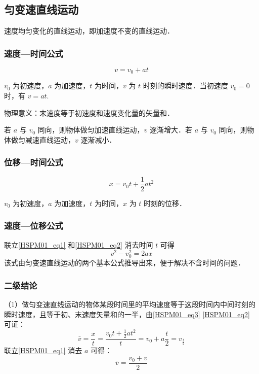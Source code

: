 \subsection{匀变速直线运动}
速度均匀变化的直线运动，即加速度不变的直线运动．
\subsubsection{速度—时间公式}
\begin{equation}\label{HSPM01_eq1}
v=v_0+at
\end{equation}

$v_0$ 为初速度，$a$ 为加速度，$t$ 为时间，$v$ 为 $t$ 时刻的瞬时速度．当初速度 $v_0=0$ 时，有 $v=at$.

物理意义：末速度等于初速度和速度变化量的矢量和．

若 $a$ 与 $v_0$ 同向，则物体做匀加速直线运动，$v$ 逐渐增大．若 $a$ 与 $v_0$ 同向，则物体做匀减速直线运动，$v$ 逐渐减小．

\subsubsection{位移—时间公式}
\begin{equation}\label{HSPM01_eq2}
x=v_0 t+\frac12at^2
\end{equation}

$v_0$ 为初速度，$a$ 为加速度，$t$ 为时间，$x$ 为 $t$ 时刻的位移．

\subsubsection{速度—位移公式}
联立\autoref{HSPM01_eq1} 和\autoref{HSPM01_eq2} 消去时间 $t$ 可得
\begin{equation}\label{HSPM01_eq4}
v^2-v_0^2=2ax
\end{equation}
该式由匀变速直线运动的两个基本公式推导出来，便于解决不含时间的问题．

\subsubsection{二级结论}
（1）做匀变速直线运动的物体某段时间里的平均速度等于这段时间内中间时刻的瞬时速度，且等于初、末速度矢量和的一半，由\autoref{HSPM01_eq3} \autoref{HSPM01_eq2} 可证：
\begin{equation}
\bar v=\frac xt=\frac{v_0t+\frac 12at^2}{t}=v_0+a\frac t2=v_{\frac t2}
\end{equation}
联立\autoref{HSPM01_eq1} 消去 $a$ 可得：
\begin{equation}
\bar v=\frac{v_0+v}{2}
\end{equation}


